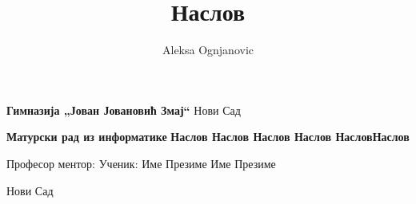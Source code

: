 \documentclass[a4paper]{article}
\title{Наслов}
\author{Aleksa Ognjanovic}
\begin{document}
\thispagestyle{empty}
\begin{center}
    \textbf{\LARGE Гимназија „Јован Јовановић Змај“}
    \break\break
    {\LARGE Нови Сад}

    \vfill

    \textbf{\huge Матурски рад из информатике}
    \break
    \break
    \textbf{\huge Наслов Наслов Наслов Наслов Наслов\break\break Наслов}

    \vfill

    {\LARGE Професор ментор:}
    \hfill
    {\LARGE Ученик:}
    \break
    \break
    {\LARGE Име Презиме}
    \hfill
    {\LARGE Име Презиме}

    \vspace*{72pt}

    {\Large Нови Сад}

    \vspace*{48pt}
\end{center}
\end{document}
